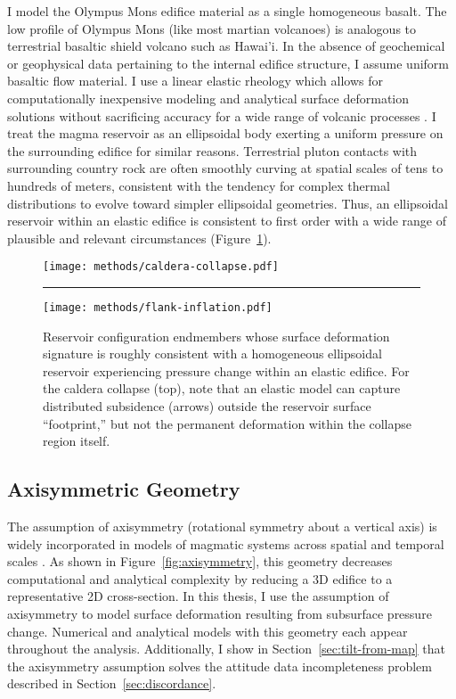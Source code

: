 I model the Olympus Mons edifice material as a single homogeneous basalt. The low profile of Olympus Mons (like most martian volcanoes) is analogous to terrestrial basaltic shield volcano such as Hawai'i. In the absence of geochemical or geophysical data pertaining to the internal edifice structure, I assume uniform basaltic flow material. I use a linear elastic rheology which allows for computationally inexpensive modeling and analytical surface deformation solutions \parencite{mogi_relations_1958} without sacrificing accuracy for a wide range of volcanic processes \parencite{grosfils_elastic_2015}. I treat the magma reservoir as an ellipsoidal body exerting a uniform pressure on the surrounding edifice for similar reasons. Terrestrial pluton contacts with surrounding country rock are often smoothly curving at spatial scales of tens to hundreds of meters, consistent with the tendency for complex thermal distributions to evolve toward simpler ellipsoidal geometries. Thus, an ellipsoidal reservoir within an elastic edifice is consistent to first order with a wide range of plausible and relevant circumstances (Figure~\ref{fig:reservoir-configs}).

\begin{figure}
    \texttt{[image: methods/caldera-collapse.pdf]}\\
    \vspace{1cm}
    \hrule
    \vspace{1cm}
    \texttt{[image: methods/flank-inflation.pdf]}
    \caption[Ellipsoidal reservoir configurations]{Reservoir configuration endmembers whose surface deformation signature is roughly consistent with a homogeneous ellipsoidal reservoir experiencing pressure change within an elastic edifice. For the caldera collapse (top), note that an elastic model can capture distributed subsidence (arrows) outside the reservoir surface ``footprint,'' but not the permanent deformation within the collapse region itself.}
    \label{fig:reservoir-configs}
\end{figure}

\subsection{Axisymmetric Geometry}

The assumption of axisymmetry (rotational symmetry about a vertical axis) is widely incorporated in models of magmatic systems across spatial and temporal scales \parencite[c.f.,][]{redmond_numerical_2004,ogawa_four-stage_2021,mogi_relations_1958,mctigue_elastic_1987}. As shown in Figure~\ref{fig:axisymmetry}, this geometry decreases computational and analytical complexity by reducing a 3D edifice to a representative 2D cross-section. In this thesis, I use the assumption of axisymmetry to model surface deformation resulting from subsurface pressure change. Numerical and analytical models with this geometry each appear throughout the analysis. Additionally, I show in Section~\ref{sec:tilt-from-map} that the axisymmetry assumption solves the attitude data incompleteness problem described in Section~\ref{sec:discordance}.

